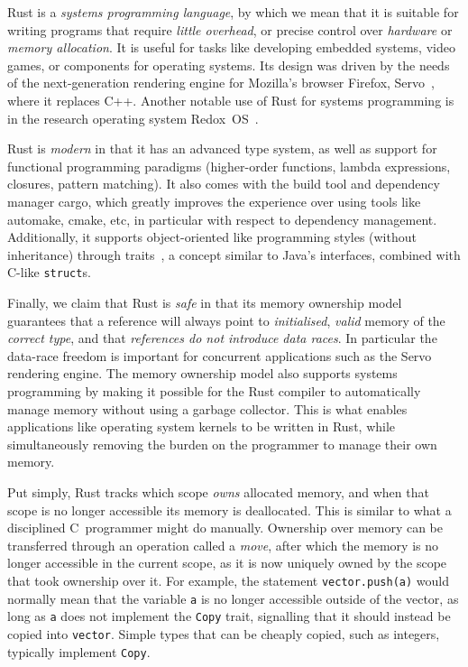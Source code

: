 \documentclass[11pt,a4paper,twoside,openany]{report}
\newcommand{\InRust}[1]{\texttt{#1}}
\begin{document}
Rust is a \textit{systems programming language}, by which we mean that it is
suitable for writing programs that require \textit{little overhead}, or precise
control over \textit{hardware} or \textit{memory allocation}. It is useful for
tasks like developing embedded systems, video games, or components for operating
systems. Its design was driven by the needs of the next-generation rendering
engine for Mozilla's browser Firefox, Servo~\cite{anderson2016engineering},
where it replaces C++. Another notable use of Rust for systems programming is in
the research operating system Redox~OS~\cite{redox}.

Rust is \textit{modern} in that it has an advanced type system, as well as
support for functional programming paradigms (higher-order functions, lambda
expressions, closures, pattern matching). It also comes with the build tool and
dependency manager cargo, which greatly improves the experience over using tools
like automake, cmake, etc, in particular with respect to dependency management.
Additionally, it supports object-oriented like programming styles (without
inheritance) through traits~\cite{scharli2003traits}, a concept similar to
Java's interfaces, combined with C-like \InRust{struct}s.

Finally, we claim that Rust is \textit{safe} in that its memory ownership model
guarantees that a reference will always point to \textit{initialised},
\textit{valid} memory of the \textit{correct type}, and that \textit{references
  do not introduce data races}. In particular the data-race freedom is important
for concurrent applications such as the Servo rendering engine. The memory
ownership model also supports systems programming by making it possible for the
Rust compiler to automatically manage memory without using a garbage collector.
This is what enables applications like operating system kernels to be written in
Rust, while simultaneously removing the burden on the programmer to manage their
own memory.

Put simply, Rust tracks which scope \textit{owns} allocated memory, and when
that scope is no longer accessible its memory is deallocated. This is similar
to what a disciplined C~programmer might do manually. Ownership over memory can
be transferred through an operation called a \textit{move}, after which the
memory is no longer accessible in the current scope, as it is now uniquely owned
by the scope that took ownership over it. For example, the statement
\InRust{vector.push(a)} would normally mean that the variable \InRust{a} is no
longer accessible outside of the vector, as long as \InRust{a} does not
implement the \InRust{Copy} trait, signalling that it should instead be copied
into \InRust{vector}. Simple types that can be cheaply copied, such as integers,
typically implement \InRust{Copy}.
\end{document}
